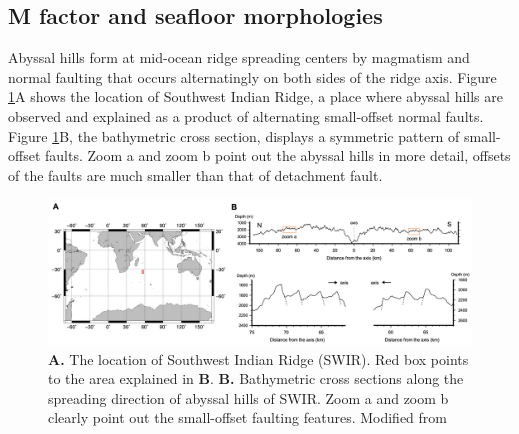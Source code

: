 \documentclass[letterpaper,12pt,notitle]{memphisthesis}                     %
\begin{document}
\subsection{M factor and seafloor morphologies}
Abyssal hills form at mid-ocean ridge spreading centers by magmatism and normal faulting that occurs alternatingly on both sides of the ridge axis. Figure \ref{fig:abyssalhill}A shows the location of Southwest Indian Ridge, a place where abyssal hills are observed and explained as a product of alternating small-offset normal faults. Figure \ref{fig:abyssalhill}B, the bathymetric cross section, displays a symmetric pattern of small-offset faults. Zoom a and zoom b point out the abyssal hills in more detail, offsets of the faults are much smaller than that of detachment fault.
%
\begin{figure}[!htb]
	\centering
	\includegraphics[width=0.95\linewidth,trim=8 8 8 8,clip]{./figs/abyssalhill.png}
	\caption{\textbf{A.} The location of Southwest Indian Ridge (SWIR). Red box points to the area explained in \textbf{B}. \textbf{B.} Bathymetric cross sections along the spreading direction of abyssal hills of SWIR. Zoom a and zoom b clearly point out the small-offset faulting features. Modified from \citet{Mendel2003}}
	\label{fig:abyssalhill}
\end{figure}
\end{document}
